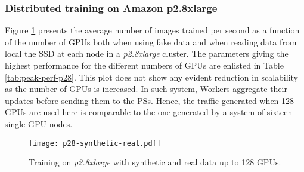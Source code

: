 \subsubsection{Distributed training on Amazon p2.8xlarge}
\vspace{-0.2cm}
Figure \ref{fig:p28} presents the average number of images trained per second as a function of the number of GPUs both when using fake data and when reading data from local the SSD at each node in a \textit{p2.8xlarge} cluster.
The parameters giving the highest performance for the different numbers of GPUs are enlisted in Table \ref{tab:peak-perf-p28}.
This plot does not show any evident reduction in scalability as the number of GPUs is increased.
In such system, Workers aggregate their updates before sending them to the PSs. 
Hence, the traffic generated when 128 GPUs are used here is comparable to the one generated by a system of sixteen single-GPU nodes.
\vspace{-0.2cm}
\begin{figure}[H]
  \centering
  \texttt{[image: p28-synthetic-real.pdf]}
  \vspace{-0.85cm}
  \caption{Training on \textit{p2.8xlarge} with synthetic and real data up to 128 GPUs.}
  \label{fig:p28}
\end{figure}
\vspace{-0.55cm}
